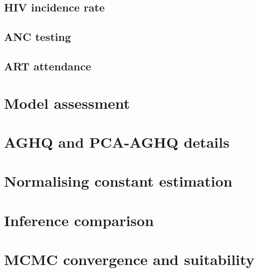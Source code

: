 \documentclass[a4paper, nobind]{templates/ociamthesis}
\begin{document}
\hypertarget{hiv-inc}{%
\subsection{HIV incidence rate}\label{hiv-inc}}

\hypertarget{anc-test}{%
\subsection{ANC testing}\label{anc-test}}

\hypertarget{art-attend}{%
\subsection{ART attendance}\label{art-attend}}

\hypertarget{model-assessment-1}{%
\section{Model assessment}\label{model-assessment-1}}

\hypertarget{aghq-and-pca-aghq-details}{%
\section{AGHQ and PCA-AGHQ details}\label{aghq-and-pca-aghq-details}}

\hypertarget{normalising-constant-estimation}{%
\section{Normalising constant estimation}\label{normalising-constant-estimation}}

\hypertarget{inference-comparison-1}{%
\section{Inference comparison}\label{inference-comparison-1}}

\hypertarget{mcmc-convergence-and-suitability}{%
\section{MCMC convergence and suitability}\label{mcmc-convergence-and-suitability}}
\end{document}
